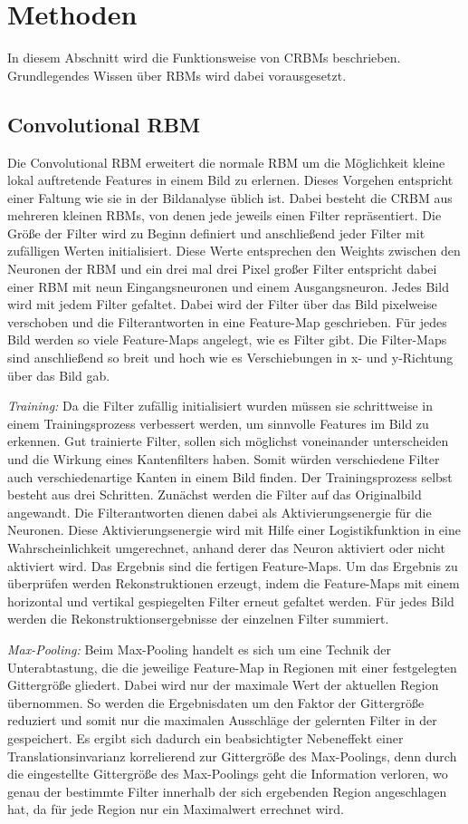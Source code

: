 \section{Methoden}\label{methods}
In diesem Abschnitt wird die Funktionsweise von CRBMs beschrieben.
Grundlegendes Wissen über RBMs wird dabei vorausgesetzt.

\subsection{Convolutional RBM}\label{CRBM}
Die Convolutional RBM erweitert die normale RBM um die Möglichkeit kleine lokal auftretende Features in einem Bild zu erlernen.
Dieses Vorgehen entspricht einer Faltung wie sie in der Bildanalyse üblich ist.
Dabei besteht die CRBM aus mehreren kleinen RBMs, von denen jede jeweils einen Filter repräsentiert.
Die Größe der Filter wird zu Beginn definiert und anschließend jeder Filter mit zufälligen Werten initialisiert.
Diese Werte entsprechen den Weights zwischen den Neuronen der RBM und ein drei mal drei Pixel großer Filter entspricht dabei einer RBM mit neun Eingangsneuronen und einem Ausgangsneuron.
Jedes Bild wird mit jedem Filter gefaltet.
Dabei wird der Filter über das Bild pixelweise verschoben und die Filterantworten in eine Feature-Map geschrieben.
Für jedes Bild werden so viele Feature-Maps angelegt, wie es Filter gibt.
Die Filter-Maps sind anschließend so breit und hoch wie es Verschiebungen in x- und y-Richtung über das Bild gab.

\textit{Training:}
Da die Filter zufällig initialisiert wurden müssen sie schrittweise in einem Trainingsprozess verbessert werden, um sinnvolle Features im Bild zu erkennen.
Gut trainierte Filter, sollen sich möglichst voneinander unterscheiden und die Wirkung eines Kantenfilters haben.
Somit würden verschiedene Filter auch verschiedenartige Kanten in einem Bild finden.
Der Trainingsprozess selbst besteht aus drei Schritten.
Zunächst werden die Filter auf das Originalbild angewandt.
Die Filterantworten dienen dabei als Aktivierungsenergie für die Neuronen.
Diese Aktivierungsenergie wird mit Hilfe einer Logistikfunktion in eine Wahrscheinlichkeit umgerechnet, anhand derer das Neuron aktiviert oder nicht aktiviert wird.
Das Ergebnis sind die fertigen Feature-Maps.
Um das Ergebnis zu überprüfen werden Rekonstruktionen erzeugt, indem die Feature-Maps mit einem horizontal und vertikal gespiegelten Filter erneut gefaltet werden.
Für jedes Bild werden die Rekonstruktionsergebnisse der einzelnen Filter summiert.

\textit{Max-Pooling:}
Beim Max-Pooling handelt es sich um eine Technik der Unterabtastung, die die jeweilige Feature-Map in Regionen mit einer festgelegten Gittergröße gliedert. 
Dabei wird nur der maximale Wert der aktuellen Region übernommen.
So werden die Ergebnisdaten um den Faktor der Gittergröße reduziert und somit nur die maximalen Ausschläge der gelernten Filter in der gespeichert.
Es ergibt sich dadurch ein beabsichtigter Nebeneffekt einer Translationsinvarianz korrelierend zur Gittergröße des Max-Poolings, denn durch die eingestellte Gittergröße des Max-Poolings geht die Information verloren, wo genau der bestimmte Filter innerhalb der sich ergebenden Region angeschlagen hat, da für jede Region nur ein Maximalwert errechnet wird.
